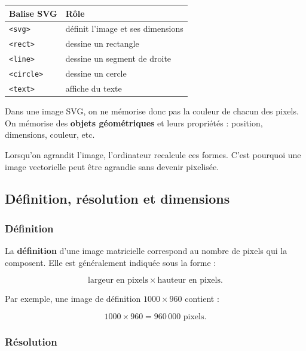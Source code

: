 \documentclass[11pt, a4paper]{book}
\begin{document}
\begin{center}
\renewcommand{\arraystretch}{1.25}

\begin{tabular}{ll}
\toprule
\textbf{Balise SVG} & \textbf{Rôle} \\
\midrule
\texttt{<svg>}    & définit l'image et ses dimensions \\
\texttt{<rect>}   & dessine un rectangle \\
\texttt{<line>}   & dessine un segment de droite \\
\texttt{<circle>} & dessine un cercle \\
\texttt{<text>}   & affiche du texte \\
\bottomrule
\end{tabular}

\end{center}

\begin{remarqueBox}
Dans une image SVG, on ne mémorise donc pas la couleur de chacun des pixels.
On mémorise des \textbf{objets géométriques} et leurs propriétés : position,
dimensions, couleur, etc.

Lorsqu'on agrandit l'image, l'ordinateur recalcule ces formes. C'est pourquoi
une image vectorielle peut être agrandie sans devenir pixelisée.
\end{remarqueBox}

\subsection{Définition, résolution et dimensions}

\subsubsection{Définition}

La \textbf{définition} d'une image matricielle correspond au nombre de pixels qui la
composent. Elle est généralement indiquée sous la forme :

\[
\text{largeur en pixels} \times \text{hauteur en pixels}.
\]

Par exemple, une image de définition $1000 \times 960$ contient :

\[
1000 \times 960 = 960\,000 \text{ pixels}.
\]

\subsubsection{Résolution}
\end{document}

